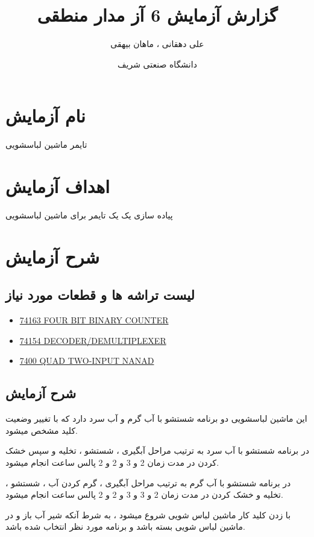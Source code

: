 \documentclass[twoside]{article}
\title{\Huge گزارش آزمایش 6 آز مدار منطقی }
\author{\Large علی دهقانی ، ماهان بیهقی}
\date{دانشگاه صنعتی شریف}
\begin{document}
	\maketitle
	\newpage
	\section*{نام آزمایش}
	تایمر ماشین لباسشویی
	
	\section*{اهداف آزمایش}
	پیاده سازی یک یک تایمر برای ماشین لباسشویی
	
	\section*{شرح آزمایش}
	
	\subsection*{لیست تراشه ها و قطعات مورد نیاز} 
	\begin{itemize}
		\item
		\href{https://www.ti.com/lit/ds/symlink/sn74f163a.pdf?ts=1672133706533&ref_url=https%253A%252F%252Fwww.google.com%252F}{74163 FOUR BIT BINARY COUNTER}
		\item
		\href{https://datasheetspdf.com/pdf/248156/NationalSemiconductor/74154/1}{74154 DECODER/DEMULTIPLEXER}
		\item
		\href{https://cdn.datasheetspdf.com/pdf-down/7/4/0/7400_FairchildSemiconductor.pdf}{7400 QUAD TWO-INPUT NANAD}
	\end{itemize}
	
	\subsection*{شرح آزمایش}
	این ماشین لباسشویی دو برنامه شستشو با آب گرم و آب سرد دارد که با تغییر وضعیت کلید مشخص میشود. 
	
	در برنامه شستشو با آب سرد به ترتیب مراحل آبگیری ، شستشو ، تخلیه و سپس خشک کردن در مدت زمان 2 و 3 و 2 و 2 پالس ساعت انجام میشود.
	
	در برنامه شستشو با آب گرم به ترتیب مراحل آبگیری ، گرم کردن آب ، شستشو ، تخلیه و خشک کردن در مدت زمان 2 و 3 و 3 و 2 و 2 پالس ساعت انجام میشود.
	
	با زدن کلید کار ماشین لباس شویی شروع میشود ، به شرط آنکه شیر آب باز و در ماشین لباس شویی بسته باشد و برنامه مورد نظر انتخاب شده باشد.
	
\end{document}
